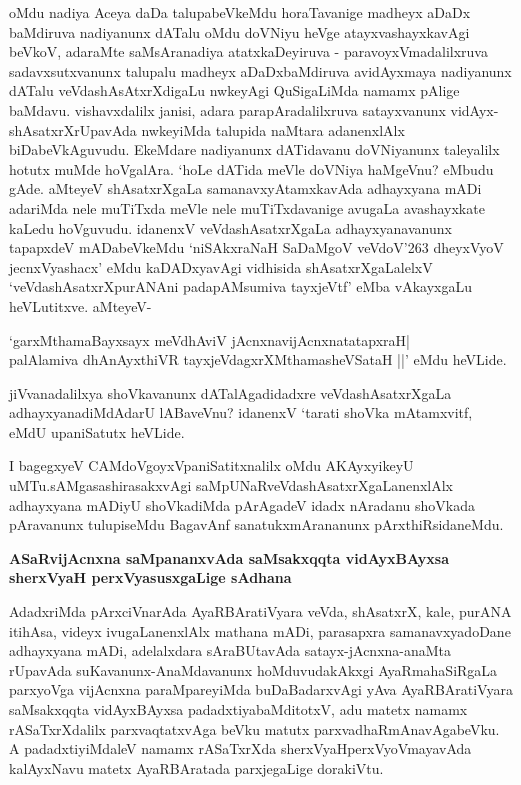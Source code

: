 \noindent
oMdu nadiya Aceya daDa talupabeVkeMdu horaTavanige madheyx aDaDx baMdiruva nadiyanunx dATalu oMdu doVNiyu heVge atayxvashayxkavAgi beVkoV, adaraMte saMsAranadiya atatxkaDeyiruva - para\-voyxVmadalilxruva sadavxsutxvanunx talupalu madheyx aDaDxbaMdiruva avidAyxmaya nadiyanunx dATalu veVda\-shAsAtxrXdigaLu nwkeyAgi QuSigaLiMda namamx pAlige baMdavu. vishavxdalilx janisi, adara parapAradalilx\-ruva satayxvanunx vidAyx-shAsatxrXrUpavAda nwkeyiMda talupida naMtara adanenxlAlx biDabeVkAguvudu. EkeM\-dare nadiyanunx dATidavanu doVNiyanunx taleyalilx hotutx muMde hoVgalAra. `hoLe dATida meVle doVNiya haMgeVnu? eMbudu gAde. aMteyeV shAsatxrXgaLa samanavxyAtamxkavAda adhayxyana mADi adariMda nele muTiTxda meVle nele muTiTxdavanige avugaLa avashayxkate kaLedu hoVguvudu. idanenxV\- veVda\-shAsatxrX\-gaLa adhayxyanavanunx tapapxdeV mADabeVkeMdu `niSAkxraNaH SaDaMgoV\label{42} veVdoV\char'263 dheyxVyoV jecnxVyashacx' eMdu kaDADxyavAgi vidhisida shAsatxrXgaLalelxV  `veVdashAsatxrXpurANAni padapAMsumiva tayxjeVtf'\label{42} eMba vAkayx\-gaLu heVLutitxve. aMteyeV-

\smallskip
\begin{shloka}
`garxMthamaBayxsayx meVdhAviV jAcnxnavijAcnxnatatapxraH|\\\label{42}
palAlamiva dhAnAyxthiVR tayxjeVdagxrXMthamasheVSataH ||' eMdu heVLide.
\end{shloka}
\smallskip

jiVvanadalilxya shoVkavanunx dATalAgadidadxre veVdashAsatxrXgaLa adhayxyanadiMdA\-darU lABaveVnu? \-idanenxV `tarati shoVka mAtamxvitf,\label{42} eMdU upaniSatutx heVLide.

I bagegxyeV CAMdoVgoyxVpaniSatitxnalilx oMdu AKAyxyikeyU uMTu.\break sAMgasashirasakxvAgi saM\-pUNaR\-veVdashAsatxrXgaLanenxlAlx adhayxyana mADiyU shoVka\-diMda pArAgadeV idadx nAradanu shoVkada pAravanunx tulupiseMdu BagavAnf sanatukxmArananunx pArxthiRsidaneMdu.

\newpage

{\bigskip
\noindent
{\large\bf ASaRvijAcnxna saMpananxvAda saMsakxqqta vidAyxBAyxsa sherxVyaH perxVyasusxgaLige sAdhana}}\label{page42}
\medskip

\noindent
AdadxriMda pArxciVnarAda AyaRBAratiVyara veVda, shAsatxrX, kale, purANA itihAsa, videyx ivugaLa\-nenxlAlx mathana mADi, parasapxra samanavxyadoDane adhayxyana mADi, adelalxdara sAraBUtavAda satayx-jAcnxna\--anaMta rUpavAda suKavanunx-AnaMda\break\-vanunx hoMduvudakAkxgi AyaRmahaSiRgaLa parxyoVga vijAcnxna paraMpareyiMda buDaBadarxvAgi yAva AyaRBAratiVyara saMsakxqqta vidAyxBAyxsa \-padadxtiya\break \hbox{baMditotxV}, adu matetx namamx rASaTxrXdalilx parxvaqtatxvAga beVku matutx parxvadhaRmAna\-vAgabeVku. A padadxtiyiMdaleV namamx rASaTxrXda sherxVyaHperxVyoVmayavAda kalAyxNavu matetx AyaRBAratada parxjegaLige dorakiVtu.

